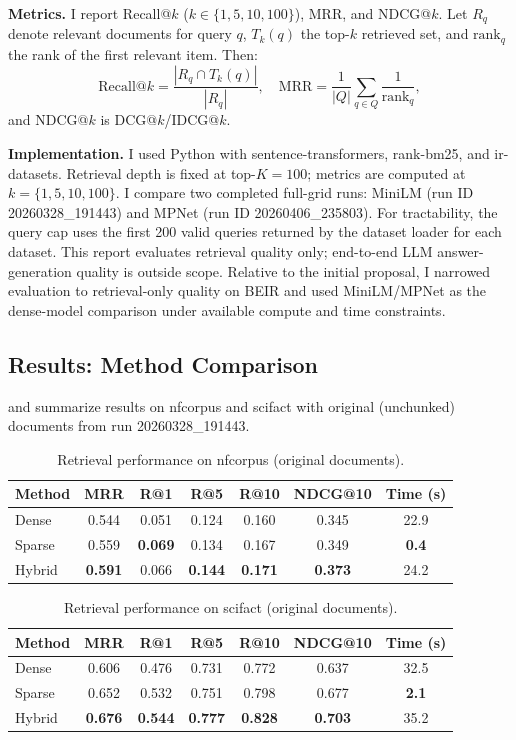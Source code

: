 \documentclass[twoside, 11pt]{article}
\newcommand{\tabref}[1]{\hyperref[#1]{\fcolorbox{red}{white}{Table~\ref*{#1}}}}
\begin{document}
\textbf{Metrics.} I report Recall@$k$ ($k \in \{1, 5, 10, 100\}$), MRR, and NDCG@$k$. Let $R_q$ denote relevant documents for query $q$, $T_k(q)$ the top-$k$ retrieved set, and $\text{rank}_q$ the rank of the first relevant item. Then:
\[
\text{Recall@}k = \frac{|R_q \cap T_k(q)|}{|R_q|}, \quad
\text{MRR} = \frac{1}{|Q|}\sum_{q \in Q}\frac{1}{\text{rank}_q},
\]
and NDCG@$k$ is DCG@$k$/IDCG@$k$.

\textbf{Implementation.} I used Python with sentence-transformers, rank-bm25, and ir-datasets. Retrieval depth is fixed at top-$K=100$; metrics are computed at $k=\{1,5,10,100\}$. I compare two completed full-grid runs: MiniLM (run ID 20260328\_191443) and MPNet (run ID 20260406\_235803). For tractability, the query cap uses the first 200 valid queries returned by the dataset loader for each dataset. This report evaluates retrieval quality only; end-to-end LLM answer-generation quality is outside scope.
Relative to the initial proposal, I narrowed evaluation to retrieval-only quality on BEIR and used MiniLM/MPNet as the dense-model comparison under available compute and time constraints.

\subsection{Results: Method Comparison}
\tabref{tab:nfcorpus} and \tabref{tab:scifact} summarize results on nfcorpus and scifact with original (unchunked) documents from run 20260328\_191443.

\begin{table}[htbp]
\centering
\caption{Retrieval performance on nfcorpus (original documents).}
\label{tab:nfcorpus}
\begin{tabular}{lcccccc}
\toprule
Method & MRR & R@1 & R@5 & R@10 & NDCG@10 & Time (s) \\
\midrule
Dense  & 0.544 & 0.051 & 0.124 & 0.160 & 0.345 & 22.9 \\
Sparse & 0.559 & \textbf{0.069} & 0.134 & 0.167 & 0.349 & \textbf{0.4} \\
Hybrid & \textbf{0.591} & 0.066 & \textbf{0.144} & \textbf{0.171} & \textbf{0.373} & 24.2 \\
\bottomrule
\end{tabular}
\end{table}

\begin{table}[htbp]
\centering
\caption{Retrieval performance on scifact (original documents).}
\label{tab:scifact}
\begin{tabular}{lcccccc}
\toprule
Method & MRR & R@1 & R@5 & R@10 & NDCG@10 & Time (s) \\
\midrule
Dense  & 0.606 & 0.476 & 0.731 & 0.772 & 0.637 & 32.5 \\
Sparse & 0.652 & 0.532 & 0.751 & 0.798 & 0.677 & \textbf{2.1} \\
Hybrid & \textbf{0.676} & \textbf{0.544} & \textbf{0.777} & \textbf{0.828} & \textbf{0.703} & 35.2 \\
\bottomrule
\end{tabular}
\end{table}
\end{document}
